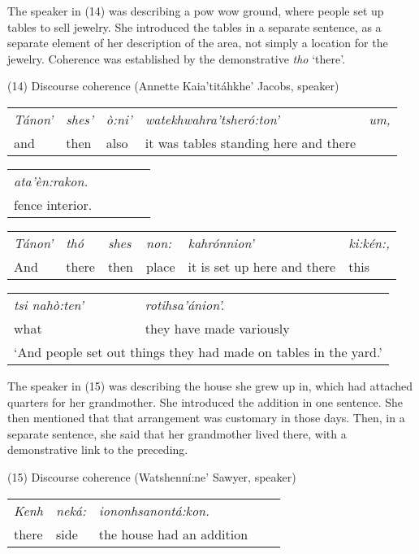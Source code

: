 \documentclass[output=paper,colorlinks,citecolor=brown
]{langscibook}
\begin{document}
The speaker in (14) was describing a pow wow ground, where people set up tables to sell jewelry. She introduced the tables in a separate sentence, as a separate element of her description of the area, not simply a location for the jewelry. Coherence was established by the demonstrative \emph{tho} `there'.\bigskip

(14) Discourse coherence (Annette Kaia'titáhkhe' Jacobs, speaker)\\

\begin{tabular}{lllll}
\emph{Tánon'} & \emph{shes'} & \emph{ò:ni'} &\emph{watekhwahra'tsheró:ton'} & \emph{um,}\\

and & then & also & it was tables standing here and there
\end{tabular}\bigskip

\begin{tabular}{lllll}
\emph{ata'èn:rakon.}\\

fence interior.
\end{tabular}\bigskip

\begin{tabular}{llllll}
\emph{Tánon'} & \emph{thó} & \emph{shes} & \emph{non:}& \emph{kahrónnion'} & \emph{ki:kén:,}\\

And & there  & then &  place & it is set up here and there & this
\end{tabular}\bigskip

\begin{tabular}{ll}
\emph{tsi nahò:ten'} &  \emph{rotihsa'ánion'.}\\
what & they have made variously\\
\multicolumn{2}{l}{`And people set out things they had made on tables in the yard.'}
\end{tabular}\bigskip

The speaker in (15) was describing the house she grew up in, which had attached quarters for her grandmother. She introduced the addition in one sentence. She then mentioned that that arrangement was customary in those days. Then, in a separate sentence, she said that her grandmother lived there, with a demonstrative link to the preceding.\bigskip

(15) Discourse coherence (Watshenní:ne' Sawyer, speaker)\\

\begin{tabular}{lllll}

\emph{Kenh} & \emph{neká:} & \emph{iononhsanontá:kon.}\\

there & side & the house had an addition
\end{tabular}\bigskip
\end{document}

